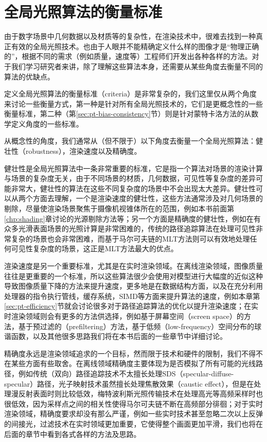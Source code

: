 \section{全局光照算法的衡量标准}\label{sec:pt-criteria}
由于数字场景中几何数据以及材质等的复杂性，在渲染技术中，很难去找到一种真正有效的全局光照技术。也由于人眼并不能精确定义什么样的图像才是“物理正确的”，根据不同的需求（例如质量，速度等）工程师们开发出各种各样的方法。对于我们学习研究者来讲，除了理解这些算法本身，还需要从某些角度去衡量不同的算法的优缺点。

定义全局光照算法的衡量标准（criteria）是非常复杂的，我们这里仅从两个角度来讨论一些衡量方式，第一种是针对所有全局光照技术的，它们是更概念性的一些衡量标准，第二种（第\ref{sec:pt-bias-consistency}节）则是针对蒙特卡洛方法的从数学定义角度的一些标准。

从概念性的角度，我们通常从（但不限于）以下角度去衡量一个全局光照算法：健壮性（robustness），渲染速度以及精确度。

健壮性是全局光照算法中一条非常重要的标准，它是指一个算法对场景的渲染计算与场景的复杂度无关，由于不同场景的材质，几何数据，可见性等复杂度的差异可能非常大，健壮性的算法在这些不同复杂度的场景中不会出现太大差异。健壮性可以从两个方面去理解，一个是渲染速度的健壮性，这些方法通常涉及对几何场景的剔除，尽量使渲染场景聚焦于摄像机视锥体所在的范围，例如本书前面第\ref{chp:shading}章讨论的光源剔除方法等；另一个方面是精确度的健壮性，例如在有众多光滑表面场景的光照计算是非常困难的，传统的路径追踪算法在处理可见性非常复杂的场景也会非常困难，而基于马尔可夫链的MLT方法则可以有效地处理任何可见性复杂度的场景，这正是MLT方法最大的优点。

渲染速度是另一个重要标准，尤其是在实时渲染领域。在离线渲染领域，图像质量往往是更重要的一个标准，所以这些算法很少会使用对模型进行大幅度的近似这种导致图像质量下降的方法来提升速度，更多地是在数据结构方面，以及在充分利用处理器的指令执行管线，缓存系统，SIMD等方面来提升算法的速度，例如本章第\ref{sec:pt-efficiency}节就会讨论很多对于路径追踪算法的优化以提升渲染速度；在实时渲染领域则会有更多的方法供选择，例如基于屏幕空间（screen space）的方法，基于预过滤的（prefiltering）方法，基于低频（low-frequency）空间分布的球谐函数，以及其他很多思路我们将在本书后面的一些章节中详细讨论。

精确度永远是渲染领域追求的一个目标，然而限于技术和硬件的限制，我们不得不在某些方面有些取舍。在离线领域精确度主要体现为是否模拟了所有可能的光线路径，例如传统（双向）路径追踪技术不太擅长处理SDS（specular-diffuse-specular）路径，光子映射技术虽然擅长处理焦散效果（caustic effect），但是在处理漫反射表面时则比较低效，梅特波利斯光照传输技术在处理高光等高频采样时也很低效，因为采样点之间的相关性使得马尔可夫链不断在高频部分徘徊；对于实时渲染领域，精确度要求却没有那么严谨，例如一些实时技术甚至忽略二次以上反弹的间接光，过滤技术在实时领域更加重要，它使得整个画面更加平滑，我们也将在后面的章节中看到各式各样的方法及思路。

